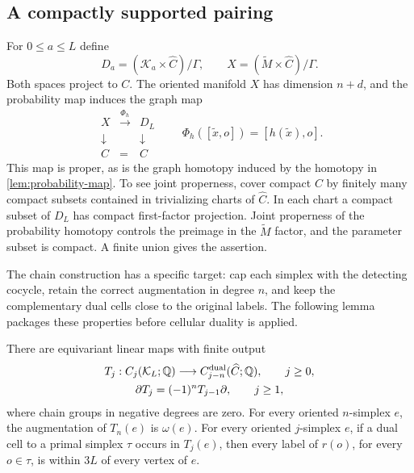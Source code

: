 \subsection{A compactly supported pairing}

For $0\le a\le L$ define
\[
 D_a=(\mathcal K_a\times\widehat C)/\Gamma,
 \qquad
 X=(\widetilde M\times\widehat C)/\Gamma.
\]
Both spaces project to $C$.  The oriented manifold $X$ has dimension
$n+d$, and the probability map induces the graph map
\[
 \begin{array}{ccc}
 X&\xrightarrow{\Phi_h}&D_L\\
 \downarrow&&\downarrow\\
 C&=&C
 \end{array}
 \qquad
 \Phi_h([\widetilde x,o])=[h(\widetilde x),o].
\]
This map is proper, as is the graph homotopy induced by the homotopy in
\cref{lem:probability-map}.  To see joint properness, cover compact $C$
by finitely many compact subsets contained in trivializing charts of
$\widehat C$.  In each chart a compact subset of $D_L$ has compact
first-factor projection.  Joint properness of the probability homotopy
controls the preimage in the $\widetilde M$ factor, and the parameter subset is compact.
A finite union gives the assertion.

The chain construction has a specific target: cap each simplex with the
detecting cocycle, retain the correct augmentation in degree $n$, and keep
the complementary dual cells close to the original labels. The following
lemma packages these properties before cellular duality is applied.

\begin{lemma}
\label{lem:controlled-cap}
There are equivariant linear maps with finite output
\begin{equation}
\label{eq:cap-chain-map}
 \begin{gathered}
 T_j:C_j(\mathcal K_L;\mathbb Q)\longrightarrow
 C_{j-n}^{\mathrm{dual}}(\widehat C;\mathbb Q),\qquad j\ge0,\\
 \partial T_j=(-1)^nT_{j-1}\partial,\qquad j\ge1,
 \end{gathered}
\end{equation}
where chain groups in negative degrees are zero. For every oriented
$n$-simplex $e$, the augmentation of $T_n(e)$ is $\omega(e)$. For every
oriented $j$-simplex $e$, if a dual cell to a primal simplex $\tau$ occurs
in $T_j(e)$, then every label of
$r(o)$, for every $o\in\tau$, is within $3L$ of every vertex of $e$.
\end{lemma}

